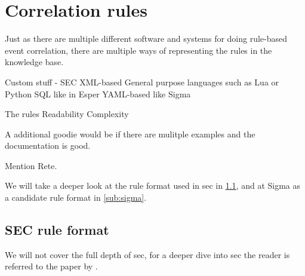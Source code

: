 \section{Correlation rules}
\label{sec:rules}
Just as there are multiple different software and systems for doing rule-based event correlation, there are multiple ways of representing the rules in the knowledge base.

Custom stuff - SEC
XML-based
General purpose languages such as Lua or Python
SQL like in Esper
YAML-based like Sigma

The rules
Readability
Complexity

A additional goodie would be if there are mulitple examples and the documentation is good.


Mention Rete.

We will take a deeper look at the rule format used in \acrfull{sec} in \cref{sub:sec-rule-format}, and at Sigma as a candidate rule format in \cref{sub:sigma}.

\subsection{SEC rule format}
\label{sub:sec-rule-format}

We will not cover the full depth of \acrshort{sec}, for a deeper dive into \acrshort{sec} the reader is referred to the paper  by \textcite{rouillard2004real}.

